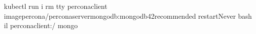 \documentclass[letterpaper,10pt,english]{sphinxmanual}
\begin{document}
\begin{enumerate}
\begin{sphinxVerbatim}[commandchars=\\\{\}]
\PYGZdl{} kubectl run \PYGZhy{}i \PYGZhy{}\PYGZhy{}rm \PYGZhy{}\PYGZhy{}tty percona\PYGZhy{}client \PYGZhy{}\PYGZhy{}imagepercona/percona\PYGZhy{}server\PYGZhy{}mongodb:mongodb42recommended \PYGZhy{}\PYGZhy{}restartNever \PYGZhy{}\PYGZhy{} bash \PYGZhy{}il
percona\PYGZhy{}client:/\PYGZdl{} mongo 
\end{sphinxVerbatim}

\end{enumerate}
\end{document}

